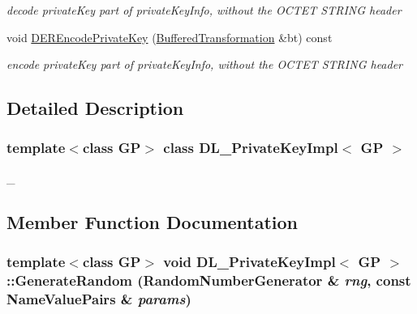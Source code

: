 \begin{DoxyCompactItemize}
\begin{DoxyCompactList}\small\item\em decode privateKey part of privateKeyInfo, without the OCTET STRING header \item\end{DoxyCompactList}\item 
\hypertarget{class_d_l___private_key_impl_aad8607ecf772a7b7faa9960152261009}{
void \hyperlink{class_d_l___private_key_impl_aad8607ecf772a7b7faa9960152261009}{DEREncodePrivateKey} (\hyperlink{class_buffered_transformation}{BufferedTransformation} \&bt) const }
\label{class_d_l___private_key_impl_aad8607ecf772a7b7faa9960152261009}

\begin{DoxyCompactList}\small\item\em encode privateKey part of privateKeyInfo, without the OCTET STRING header \item\end{DoxyCompactList}\end{DoxyCompactItemize}


\subsection{Detailed Description}
\subsubsection*{template$<$class GP$>$ class DL\_\-PrivateKeyImpl$<$ GP $>$}

\_\- 

\subsection{Member Function Documentation}
\hypertarget{class_d_l___private_key_impl_ab80a3771a5ef623677775f7c5dddb1e0}{
\subsubsection[{GenerateRandom}]{\setlength{\rightskip}{0pt plus 5cm}template$<$class GP$>$ void {\bf DL\_\-PrivateKeyImpl}$<$ GP $>$::GenerateRandom ({\bf RandomNumberGenerator} \& {\em rng}, \/  const {\bf NameValuePairs} \& {\em params})}}
\label{class_d_l___private_key_impl_ab80a3771a5ef623677775f7c5dddb1e0}


